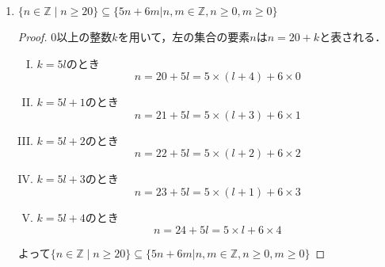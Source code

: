 \documentclass[a4paper,12pt]{ltjsarticle}
\newcommand{\Z}{\mathbb{Z}}
\begin{document}
\begin{enumerate}[(1)]
\begin{proof}
\begin{itemize}
\begin{align*}
                        \therefore (x - 1)(x - 2) &\leq 0 \\
                        x^2 - 3x + 2 &\leq 0
                    \end{align*}
            \end{itemize}
        \end{proof}
    \item $\{ n \in \Z \mid n \geq 20 \} \subseteq \{ 5n + 6m | n,m \in \Z, n \geq 0, m \geq 0 \}$
        \begin{proof}
            0以上の整数$k$を用いて，左の集合の要素$n$は$n = 20 + k$と表される．
            \begin{enumerate}[(I)]
                \item $k = 5l$のとき
                    \begin{equation*}
                        n = 20 + 5l = 5 \times (l + 4) + 6 \times 0
                    \end{equation*}
                \item $k = 5l + 1$のとき
                    \begin{equation*}
                        n = 21 + 5l = 5 \times (l + 3) + 6 \times 1
                    \end{equation*}
                \item $k = 5l + 2$のとき
                    \begin{equation*}
                        n = 22 + 5l = 5 \times (l + 2) + 6 \times 2
                    \end{equation*}
                \item $k = 5l + 3$のとき
                    \begin{equation*}
                        n = 23 + 5l = 5 \times (l + 1) + 6 \times 3
                    \end{equation*}
                \item $k = 5l + 4$のとき
                    \begin{equation*}
                        n = 24 + 5l = 5 \times l + 6 \times 4
                    \end{equation*}
            \end{enumerate}
            よって$\{ n \in \Z \mid n \geq 20 \} \subseteq \{ 5n + 6m | n,m \in \Z, n \geq 0, m \geq 0 \}$
        \end{proof}
\end{enumerate}
\end{document}
